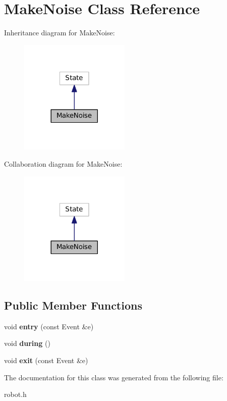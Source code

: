 \hypertarget{classMakeNoise}{\section{Make\+Noise Class Reference}
\label{classMakeNoise}
}


Inheritance diagram for Make\+Noise\+:
\nopagebreak
\begin{figure}[H]
\begin{center}
\leavevmode
\includegraphics[width=149pt]{classMakeNoise__inherit__graph}
\end{center}
\end{figure}


Collaboration diagram for Make\+Noise\+:
\nopagebreak
\begin{figure}[H]
\begin{center}
\leavevmode
\includegraphics[width=149pt]{classMakeNoise__coll__graph}
\end{center}
\end{figure}
\subsection*{Public Member Functions}
\begin{DoxyCompactItemize}
\item 
\hypertarget{classMakeNoise_a30f1a1e0d701b910521e0d348332d277}{void {\bfseries entry} (const Event \&e)}\label{classMakeNoise_a30f1a1e0d701b910521e0d348332d277}

\item 
\hypertarget{classMakeNoise_a9631c7b76aab917d348a381ac70c9e09}{void {\bfseries during} ()}\label{classMakeNoise_a9631c7b76aab917d348a381ac70c9e09}

\item 
\hypertarget{classMakeNoise_a3857af8ef3595b9cdafcbb790a842a21}{void {\bfseries exit} (const Event \&e)}\label{classMakeNoise_a3857af8ef3595b9cdafcbb790a842a21}

\end{DoxyCompactItemize}


The documentation for this class was generated from the following file\+:\begin{DoxyCompactItemize}
\item 
robot.\+h\end{DoxyCompactItemize}
